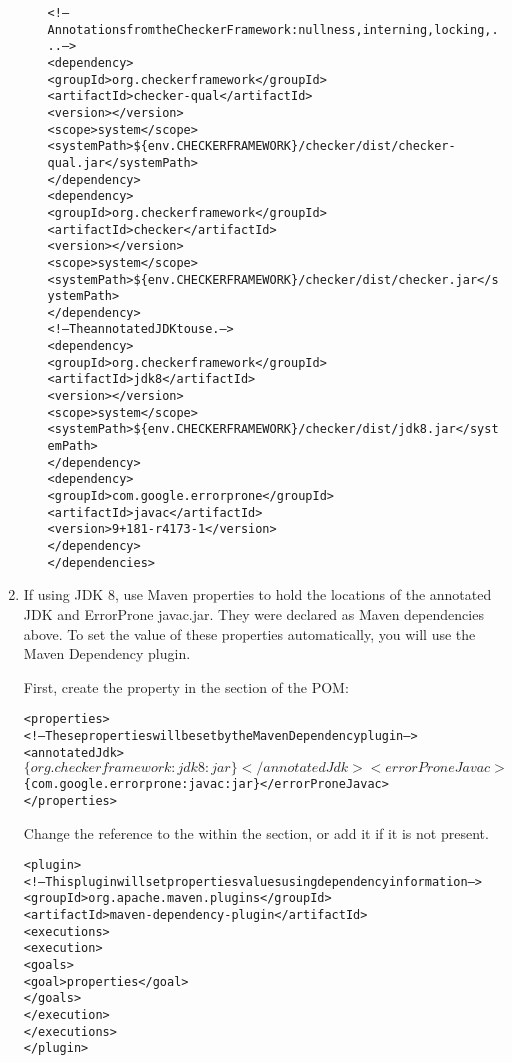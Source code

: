 \begin{enumerate}
\begin{enumerate}
\begin{alltt}
    <!-- Annotations from the Checker Framework: nullness, interning, locking, ... -->
    <dependency>
      <groupId>org.checkerframework</groupId>
      <artifactId>checker-qual</artifactId>
      <version>\ReleaseVersion{}</version>
      <scope>system</scope>
      <systemPath>\$\{env.CHECKERFRAMEWORK\}/checker/dist/checker-qual.jar</systemPath>
    </dependency>
    <dependency>
      <groupId>org.checkerframework</groupId>
      <artifactId>checker</artifactId>
      <version>\ReleaseVersion{}</version>
      <scope>system</scope>
      <systemPath>\$\{env.CHECKERFRAMEWORK\}/checker/dist/checker.jar</systemPath>
    </dependency>
    <!-- The annotated JDK to use. -->
    <dependency>
      <groupId>org.checkerframework</groupId>
      <artifactId>jdk8</artifactId>
      <version>\ReleaseVersion{}</version>
      <scope>system</scope>
      <systemPath>\$\{env.CHECKERFRAMEWORK\}/checker/dist/jdk8.jar</systemPath>
    </dependency>
    <dependency>
    <groupId>com.google.errorprone</groupId>
      <artifactId>javac</artifactId>
      <version>9+181-r4173-1</version>
    </dependency>
  </dependencies>
\end{alltt}

\end{enumerate}


\item If using JDK 8, use Maven properties to hold the locations of the
  annotated JDK and ErrorProne javac.jar.  They were declared as Maven dependencies above.
To set the value of these properties automatically, you will use the Maven Dependency plugin.

First, create the property in the  section of the POM:

\begin{alltt}
<properties>
  <!-- These properties will be set by the Maven Dependency plugin -->
  <annotatedJdk>$\{org.checkerframework:jdk8:jar\}</annotatedJdk>
  <errorProneJavac>$\{com.google.errorprone:javac:jar\}</errorProneJavac>
</properties>
\end{alltt}

Change the reference to the  within the 
section, or add it if it is not present.

\begin{alltt}
  <plugin>
    <!-- This plugin will set properties values using dependency information -->
    <groupId>org.apache.maven.plugins</groupId>
    <artifactId>maven-dependency-plugin</artifactId>
    <executions>
      <execution>
        <goals>
          <goal>properties</goal>
        </goals>
      </execution>
    </executions>
  </plugin>
\end{alltt}


\end{enumerate}
